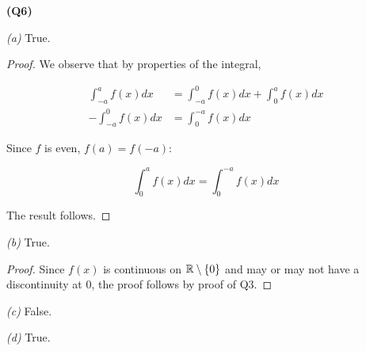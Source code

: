 \documentclass[12pt, a4paper]{article}
\begin{document}
\textbf{(Q6)}

\textit{(a)} True.

\begin{proof}
    We observe that by properties of the integral,

    \begin{align*}
        \int_{-a}^a f(x) dx & = \int_{-a}^0 f(x) dx + \int_{0}^{a} f(x) dx\\
        -\int_{-a}^0 f(x) dx & = \int_{0}^{-a} f(x) dx
    \end{align*}

    Since $f$ is even, $f(a) = f(-a)$:

    \[
        \int_0^a f(x)dx = \int_0^{-a} f(x) dx
    \]

    The result follows.

\end{proof}

\textit{(b)} True.

\begin{proof}
    Since $f(x)$ is continuous on $\mathbb{R} \setminus \{0\}$ and may or may not
    have a discontinuity at 0, the proof follows by proof of Q3.
\end{proof}

\textit{(c)} False. 

\textit{(d)} True.
\end{document}

